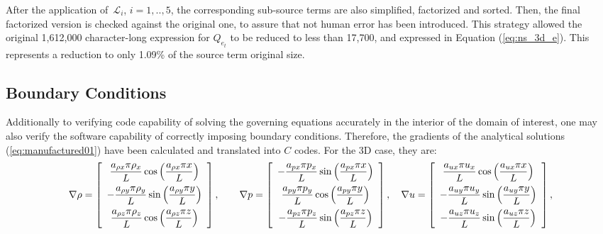 \documentclass[10pt]{article}
\newcommand{\Lo}{\,\mathcal{L}}
\begin{document}
 After the application of $\Lo_i$, $i=1,..,5$, the corresponding sub-source terms are also simplified, factorized and sorted. Then, the final factorized version is checked against the original one, to assure that not human error has been introduced.  This strategy allowed the original  1,612,000 character-long  expression for $Q_{e_t}$ to be reduced to less than 17,700, and expressed in Equation (\ref{eq:ns_3d_e}). This represents a reduction to only 1.09\% of the source term original size.

\subsection{Boundary Conditions}
Additionally to verifying code capability of solving the governing equations accurately in the interior of the domain of interest, one may also verify the software capability of correctly imposing boundary conditions. Therefore, the gradients of the  analytical solutions (\ref{eq:manufactured01}) have been calculated and translated into $C$ codes. For the 3D case, they are:
\begin{equation*}
\nabla  \rho= \left[ \begin{array}{c}
 \dfrac{  a_{\rho x}  \pi \rho_x}{L} \cos\left( \dfrac{ a_{\rho x}  \pi  x}{L}\right)\vspace{5pt} \\
-\dfrac{  a_{\rho y}  \pi \rho_y}{L} \sin\left( \dfrac{ a_{\rho y}  \pi  y}{L}\right)\vspace{5pt}\\
 \dfrac{  a_{\rho z}  \pi \rho_z}{L}  \cos\left( \dfrac{ a_{\rho z}  \pi  z}{L}\right)
\end{array} \right],
\qquad
\nabla p = \left[ \begin{array}{c}
- \dfrac{  a_{px}  \pi p_x}{L} \sin\left( \dfrac{ a_{px}  \pi  x}{L}\right)\vspace{5pt}\\
  \dfrac{  a_{py}  \pi p_y}{L} \cos\left( \dfrac{ a_{py}  \pi  y}{L}\right) \vspace{5pt}\\
- \dfrac{  a_{pz}  \pi p_z}{L} \sin\left( \dfrac{ a_{pz}  \pi  z}{L}\right)
\end{array} \right],
\quad
\nabla u = \left[ \begin{array}{c}
  \dfrac{  a_{ux}  \pi u_x}{L} \cos\left( \dfrac{ a_{ux}  \pi  x}{L}\right)\vspace{5pt}\\
 -   \dfrac{  a_{uy}  \pi u_y}{L} \sin\left( \dfrac{ a_{uy}  \pi  y}{L}\right)\vspace{5pt}\\
 -   \dfrac{  a_{uz}  \pi u_z}{L} \sin\left( \dfrac{ a_{uz}  \pi  z}{L}\right)
\end{array} \right],
\end{equation*}
\end{document}

